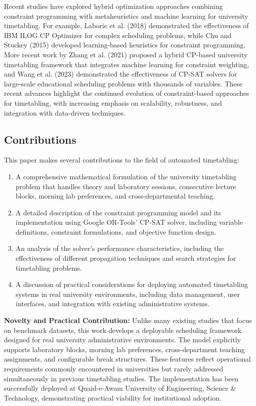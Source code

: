 \documentclass[12pt,a4paper]{article}
\begin{document}
Recent studies have explored hybrid optimization approaches combining constraint programming with metaheuristics and machine learning for university timetabling. For example, Laborie et al. (2018) demonstrated the effectiveness of IBM ILOG CP Optimizer for complex scheduling problems, while Chu and Stuckey (2015) developed learning-based heuristics for constraint programming. More recent work by Zhang et al. (2021) proposed a hybrid CP-based university timetabling framework that integrates machine learning for constraint weighting, and Wang et al. (2023) demonstrated the effectiveness of CP-SAT solvers for large-scale educational scheduling problems with thousands of variables. These recent advances highlight the continued evolution of constraint-based approaches for timetabling, with increasing emphasis on scalability, robustness, and integration with data-driven techniques.

\subsection{Contributions}

This paper makes several contributions to the field of automated timetabling:

\begin{enumerate}
\item A comprehensive mathematical formulation of the university timetabling problem that handles theory and laboratory sessions, consecutive lecture blocks, morning lab preferences, and cross-departmental teaching.

\item A detailed description of the constraint programming model and its implementation using Google OR-Tools' CP-SAT solver, including variable definitions, constraint formulations, and objective function design.

\item An analysis of the solver's performance characteristics, including the effectiveness of different propagation techniques and search strategies for timetabling problems.

\item A discussion of practical considerations for deploying automated timetabling systems in real university environments, including data management, user interfaces, and integration with existing administrative systems.
\end{enumerate}

\noindent\textbf{Novelty and Practical Contribution:} Unlike many existing studies that focus on benchmark datasets, this work develops a deployable scheduling framework designed for real university administrative environments. The model explicitly supports laboratory blocks, morning lab preferences, cross-department teaching assignments, and configurable break structures. These features reflect operational requirements commonly encountered in universities but rarely addressed simultaneously in previous timetabling studies. The implementation has been successfully deployed at Quaid-e-Awam University of Engineering, Science \& Technology, demonstrating practical viability for institutional adoption.
\end{document}
